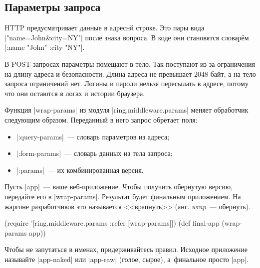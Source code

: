 \subsection{Параметры запроса}

\label{ring-params}


HTTP предусматривает данные в адреснй строке. Это пары вида
\spverb|"name=John&city=NY"| после знака вопроса. В коде они становятся
словар\"{е}м \spverb|{:name "John" :city "NY"}|.

В POST-запросах параметры помещают в тело. Так поступают из-за ограничения на
длину адреса и безопасности. Длина адреса не превышает 2048 байт, а на тело
запроса ограничений нет. Логины и пароли нельзя пересылать в адресе, потому что
они остаются в логах и истории браузера.


Функция \spverb|wrap-params| из модуля \spverb|ring.middleware.params| меняет
обработчик следующим образом. Переданный в него запрос обретает поля:

\begin{itemize}

\item
  \spverb|:query-params|~--- словарь параметров из адреса;

\item
  \spverb|:form-params|~--- словарь данных из тела запроса;

\item
  \spverb|:params|~--- их комбинированная версия.

\end{itemize}

Пусть \spverb|app|~--- ваше веб-приложение. Чтобы получить обернутую версию,
передайте его в \spverb|wrap-params|. Результат будет финальным приложением. На
жаргоне разработчиков это называется <<врапнуть>> (анг. \emph{wrap}~---
обернуть).


\begin{english}
  \begin{clojure}
(require '[ring.middleware.params :refer [wrap-params]])
(def final-app (wrap-params app))
  \end{clojure}
\end{english}

Чтобы не запутаться в именах, придерживайтесь правил. Исходное приложение
называйте \spverb|app-naked| или \spverb|app-raw| (голое, сырое), а~финальное
просто \spverb|app|.


